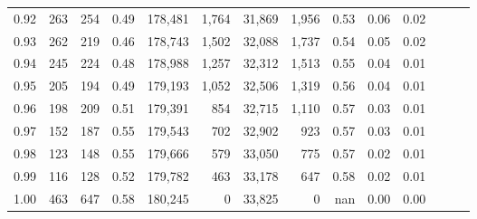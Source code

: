 \begin{tabular}{rrrrrrrrrrrrrr}
0.92 &    263 &  254 &  0.49 &  178,481 &    1,764 &  31,869 &   1,956 &  0.53 &  0.06 &      0.02 \\
0.93 &    262 &  219 &  0.46 &  178,743 &    1,502 &  32,088 &   1,737 &  0.54 &  0.05 &      0.02 \\
0.94 &    245 &  224 &  0.48 &  178,988 &    1,257 &  32,312 &   1,513 &  0.55 &  0.04 &      0.01 \\
0.95 &    205 &  194 &  0.49 &  179,193 &    1,052 &  32,506 &   1,319 &  0.56 &  0.04 &      0.01 \\
0.96 &    198 &  209 &  0.51 &  179,391 &      854 &  32,715 &   1,110 &  0.57 &  0.03 &      0.01 \\
0.97 &    152 &  187 &  0.55 &  179,543 &      702 &  32,902 &     923 &  0.57 &  0.03 &      0.01 \\
0.98 &    123 &  148 &  0.55 &  179,666 &      579 &  33,050 &     775 &  0.57 &  0.02 &      0.01 \\
0.99 &    116 &  128 &  0.52 &  179,782 &      463 &  33,178 &     647 &  0.58 &  0.02 &      0.01 \\
1.00 &    463 &  647 &  0.58 &  180,245 &        0 &  33,825 &       0 &   nan &  0.00 &      0.00 \\
\bottomrule
\end{tabular}
